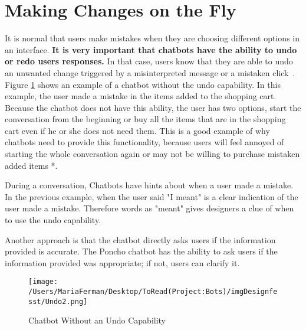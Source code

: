 \documentclass[a4paper,10pt]{article}
\begin{document}
\section{Making Changes on the Fly}

It is normal that users make mistakes when they are choosing different options in an interface. \textbf{It is very important that chatbots have the ability to undo or redo users responses.} In that case, users know that they are able to undo an unwanted change triggered by a misinterpreted message or a mistaken click~\cite{HeuristicsWebPage}. %
Figure \ref{FigureUndo} shows an example of a chatbot without the undo capability. In this example, the user made a mistake in the items added to the shopping cart. Because the chatbot does not have this ability, the user has two options, start the conversation from the beginning or buy all the items that are in the shopping cart even if he or she does not need them. This is a good example of why chatbots need to provide this functionality, because users will feel annoyed of starting the whole conversation again or may not be willing to purchase mistaken added items *. 

During a conversation, Chatbots have hints about when a user made a mistake. In the previous example, when the user said "I meant" is a clear indication of the user made a mistake. Therefore words as "meant" gives designers a clue of when to use the undo capability.

Another approach is that the chatbot directly asks users if the information provided is accurate. The Poncho chatbot has the ability to ask users if the information provided was appropriate; if not, users can clarify it.  

\begin{figure}
\centering
\texttt{[image: /Users/MariaFerman/Desktop/ToRead(Project:Bots)/imgDesignfesst/Undo2.png]}
\caption{Chatbot Without an Undo Capability}
\label{FigureUndo}
\end{figure}


\end{document}
